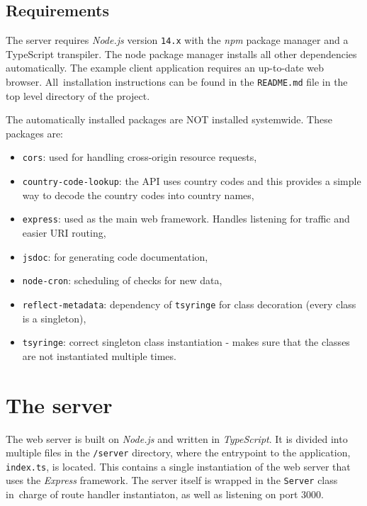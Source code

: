 \documentclass[pdftex, 11pt, a4paper]{article}
\newcommand{\code}{\texttt}
\begin{document}
    \subsection{Requirements}
    The server requires \emph{Node.js} version \code{14.x} with the \emph{npm} package manager
    and a TypeScript transpiler. The node package manager installs
    all other dependencies automatically. The example client
    application requires an up-to-date web browser. All~installation instructions
    can be found in the \code{README.md} file in the top level directory of the project.

    The automatically installed packages are NOT installed systemwide. These packages are:
    \begin{itemize}
        \item \code{cors}: used for handling cross-origin resource requests,
        \item \code{country-code-lookup}: the API uses country codes and this provides a simple
            way to decode the country codes into country names,
        \item \code{express}: used as the main web framework. Handles listening for traffic and
            easier URI routing,
        \item \code{jsdoc}: for generating code documentation,
        \item \code{node-cron}: scheduling of checks for new data,
        \item \code{reflect-metadata}: dependency of \code{tsyringe} for class decoration (every class
            is a singleton),
        \item \code{tsyringe}: correct singleton class instantiation - makes sure
            that the classes are not instantiated multiple times.
    \end{itemize}

    \section{The server}
    The web server is built on \emph{Node.js} and written in \emph{TypeScript}.
    It is divided into multiple files in the \code{/server} directory, where
    the entrypoint to the application, \code{index.ts}, is located. This contains
    a single instantiation of the web server that uses the \emph{Express} framework.
    The server itself is wrapped in the \code{Server} class in~charge of route handler
    instantiaton, as well as listening on port 3000.
\end{document}

